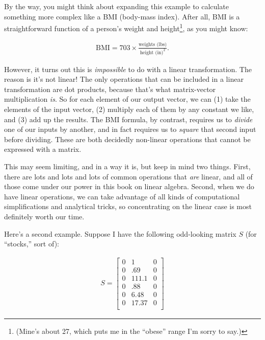 By the way, you might think about expanding this example to calculate something
more complex like a BMI (body-mass index). After all, BMI is a straightforward
function of a person's weight and height\footnote{(Mine's about 27, which puts
me in the ``obese'' range I'm sorry to say.)}, as you might know:

\vspace{-.15in}
\begin{align*}
\textrm{BMI} = 703 \times \frac{\textrm{weights (lbs)}}{\textrm{height (in)}^2}.
\end{align*}
\vspace{-.15in}


However, it turns out this is \textit{impossible} to do with a linear
transformation. The reason is it's not linear! The only operations that can be
included in a linear transformation are dot products, because that's what
matrix-vector multiplication \textit{is}. So for each element of our output
vector, we can (1) take the elements of the input vector, (2) multiply each of
them by any constant we like, and (3) add up the results. The BMI formula, by
contrast, requires us to \textit{divide} one of our inputs by another, and in
fact requires us to \textit{square} that second input before dividing. These
are both decidedly non-linear operations that cannot be expressed with a
matrix.

This may seem limiting, and in a way it is, but keep in mind two things. First,
there are lots and lots and lots of common operations that \textit{are} linear,
and all of those come under our power in this book on linear algebra. Second,
when we do have linear operations, we can take advantage of all kinds of
computational simplifications and analytical tricks, so concentrating on the
linear case is most definitely worth our time.

\bigskip

Here's a second example. Suppose I have the following odd-looking matrix $S$
(for ``stocks,'' sort of):

\vspace{-.15in}
\begin{align*}
S =
\begin{bmatrix}
0 & 1 & 0 \\
0 & .69 & 0 \\
0 & 111.1 & 0 \\
0 & .88 & 0 \\
0 & 6.48 & 0 \\
0 & 17.37 & 0 \\
\end{bmatrix}
\end{align*}
\vspace{-.15in}

